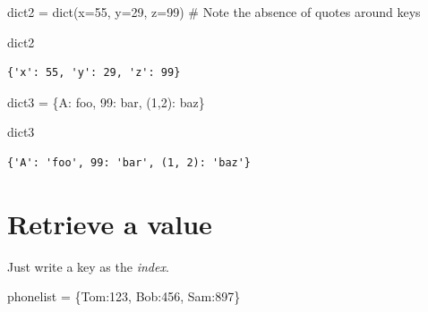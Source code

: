 \documentclass[
  letterpaper,
  DIV=11,
  numbers=noendperiod]{scrreprt}
\newenvironment{Shaded}{\begin{snugshade}}{\end{snugshade}}
\newcommand{\BuiltInTok}[1]{\textcolor[rgb]{0.00,0.23,0.31}{#1}}
\newcommand{\CommentTok}[1]{\textcolor[rgb]{0.37,0.37,0.37}{#1}}
\newcommand{\DecValTok}[1]{\textcolor[rgb]{0.68,0.00,0.00}{#1}}
\newcommand{\NormalTok}[1]{\textcolor[rgb]{0.00,0.23,0.31}{#1}}
\newcommand{\OperatorTok}[1]{\textcolor[rgb]{0.37,0.37,0.37}{#1}}
\newcommand{\StringTok}[1]{\textcolor[rgb]{0.13,0.47,0.30}{#1}}
\begin{document}
\begin{Shaded}
\begin{Highlighting}[]
\NormalTok{dict2 }\OperatorTok{=} \BuiltInTok{dict}\NormalTok{(x}\OperatorTok{=}\DecValTok{55}\NormalTok{, y}\OperatorTok{=}\DecValTok{29}\NormalTok{, z}\OperatorTok{=}\DecValTok{99}\NormalTok{) }\CommentTok{\# Note the absence of quotes around keys}
\end{Highlighting}
\end{Shaded}

\begin{Shaded}
\begin{Highlighting}[]
\NormalTok{dict2}
\end{Highlighting}
\end{Shaded}

\begin{verbatim}
{'x': 55, 'y': 29, 'z': 99}
\end{verbatim}

\begin{Shaded}
\begin{Highlighting}[]
\NormalTok{dict3 }\OperatorTok{=}\NormalTok{ \{}\StringTok{\textquotesingle{}A\textquotesingle{}}\NormalTok{: }\StringTok{\textquotesingle{}foo\textquotesingle{}}\NormalTok{, }\DecValTok{99}\NormalTok{: }\StringTok{\textquotesingle{}bar\textquotesingle{}}\NormalTok{, (}\DecValTok{1}\NormalTok{,}\DecValTok{2}\NormalTok{): }\StringTok{\textquotesingle{}baz\textquotesingle{}}\NormalTok{\}}
\end{Highlighting}
\end{Shaded}

\begin{Shaded}
\begin{Highlighting}[]
\NormalTok{dict3}
\end{Highlighting}
\end{Shaded}

\begin{verbatim}
{'A': 'foo', 99: 'bar', (1, 2): 'baz'}
\end{verbatim}

\hypertarget{retrieve-a-value-1}{%
\section{Retrieve a value}\label{retrieve-a-value-1}}

Just write a key as the \emph{index}.

\begin{Shaded}
\begin{Highlighting}[]
\NormalTok{phonelist }\OperatorTok{=}\NormalTok{ \{}\StringTok{\textquotesingle{}Tom\textquotesingle{}}\NormalTok{:}\DecValTok{123}\NormalTok{, }\StringTok{\textquotesingle{}Bob\textquotesingle{}}\NormalTok{:}\DecValTok{456}\NormalTok{, }\StringTok{\textquotesingle{}Sam\textquotesingle{}}\NormalTok{:}\DecValTok{897}\NormalTok{\}}
\end{Highlighting}
\end{Shaded}
\end{document}
